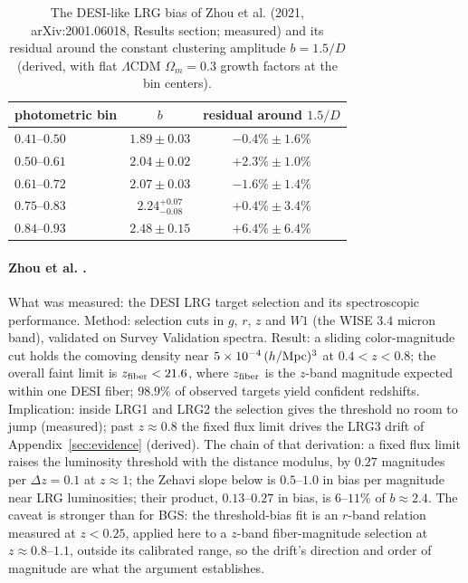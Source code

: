 \documentclass[11pt]{article}
\begin{document}
\begin{table}[ht]
  \centering
  \begin{tabular}{lcc}
    \hline
    photometric bin & $b$ & residual around $1.5/D$ \\
    \hline
    $0.41$--$0.50$ & $1.89 \pm 0.03$ & $-0.4\% \pm 1.6\%$ \\
    $0.50$--$0.61$ & $2.04 \pm 0.02$ & $+2.3\% \pm 1.0\%$ \\
    $0.61$--$0.72$ & $2.07 \pm 0.03$ & $-1.6\% \pm 1.4\%$ \\
    $0.75$--$0.83$ & $2.24^{+0.07}_{-0.08}$ & $+0.4\% \pm 3.4\%$ \\
    $0.84$--$0.93$ & $2.48 \pm 0.15$ & $+6.4\% \pm 6.4\%$ \\
    \hline
  \end{tabular}
  \caption{The DESI-like LRG bias of Zhou et al. (2021,
    arXiv:2001.06018, Results section; measured) and its residual
    around the constant clustering amplitude $b = 1.5/D$ (derived,
    with flat $\Lambda$CDM $\Omega_m = 0.3$ growth factors at the bin
    centers).}
  \label{tab:zhou}
\end{table}

\paragraph{Zhou et al. \cite{Zhou2023lrg}.}
What was measured: the DESI LRG target selection and its
spectroscopic performance.  Method: selection cuts in $g$, $r$, $z$
and $W1$ (the WISE $3.4$ micron band), validated on Survey
Validation spectra.  Result: a sliding color-magnitude cut holds the
comoving density near $5 \times 10^{-4}\,(h/{\rm Mpc})^3$ at
$0.4 < z < 0.8$; the overall faint limit is $z_{\rm fiber} < 21.6$,
where $z_{\rm fiber}$ is the $z$-band magnitude expected within one
DESI fiber; $98.9\%$ of observed targets yield confident redshifts.
Implication: inside LRG1 and LRG2 the selection gives the threshold
no room to jump (measured); past $z \approx 0.8$ the fixed flux
limit drives the LRG3 drift of Appendix~\ref{sec:evidence} (derived).
The chain of that derivation: a fixed flux limit raises the
luminosity threshold with the distance modulus, by $0.27$ magnitudes
per $\Delta z = 0.1$ at $z \approx 1$; the Zehavi slope below is
$0.5$--$1.0$ in bias per magnitude near LRG luminosities; their
product, $0.13$--$0.27$ in bias, is $6$--$11\%$ of $b \approx 2.4$.
The caveat is stronger than for BGS: the threshold-bias fit is an
$r$-band relation measured at $z < 0.25$, applied here to a $z$-band
fiber-magnitude selection at $z \approx 0.8$--$1.1$, outside its
calibrated range, so the drift's direction and order of magnitude
are what the argument establishes.
\end{document}

